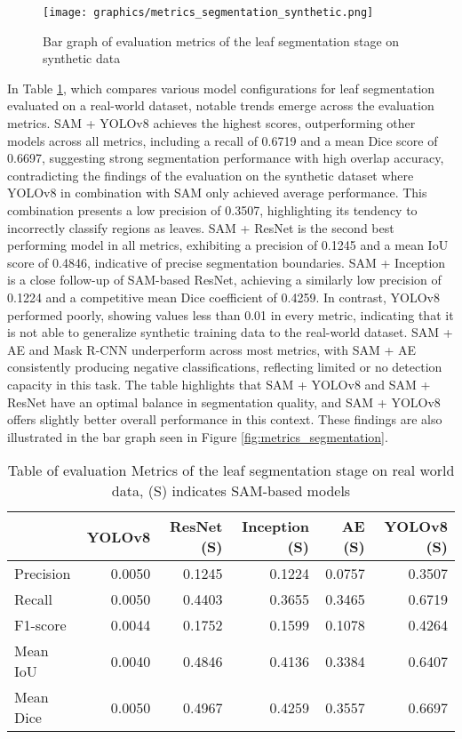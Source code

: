\documentclass[draft,final]{vutinfth} %
\begin{document}
\begin{figure}
    \centering
    \texttt{[image: graphics/metrics\_segmentation\_synthetic.png]}
    \caption{Bar graph of evaluation metrics of the leaf segmentation stage on synthetic data}
    \label{fig:metrics_segmentation_synthetic}
\end{figure}

In Table \ref{tab:metrics_segmentation}, which compares various model configurations for leaf segmentation evaluated on a real-world dataset, notable trends emerge across the evaluation metrics. SAM + YOLOv8 achieves the highest scores, outperforming other models across all metrics, including a recall of 0.6719 and a mean Dice score of 0.6697, suggesting strong segmentation performance with high overlap accuracy, contradicting the findings of the evaluation on the synthetic dataset where YOLOv8 in combination with SAM only achieved average performance. This combination presents a low precision of 0.3507, highlighting its tendency to incorrectly classify regions as leaves. SAM + ResNet is the second best performing model in all metrics, exhibiting a precision of 0.1245 and a mean IoU score of 0.4846, indicative of precise segmentation boundaries. SAM + Inception is a close follow-up of SAM-based ResNet, achieving a similarly low precision of 0.1224 and a competitive mean Dice coefficient of 0.4259. In contrast, YOLOv8 performed poorly, showing values less than 0.01 in every metric, indicating that it is not able to generalize synthetic training data to the real-world dataset. SAM + AE and Mask R-CNN underperform across most metrics, with SAM + AE consistently producing negative classifications, reflecting limited or no detection capacity in this task. The table highlights that SAM + YOLOv8 and SAM + ResNet have an optimal balance in segmentation quality, and SAM + YOLOv8 offers slightly better overall performance in this context. These findings are also illustrated in the bar graph seen in Figure \ref{fig:metrics_segmentation}.

\begin{table}[]
    \centering
    \begin{tabular}{lrrrrr}
    \toprule
     & YOLOv8 & ResNet (S) & Inception (S) & AE (S) & YOLOv8 (S) \\
    \midrule
    Precision & 0.0050 & 0.1245 & 0.1224 & 0.0757 & 0.3507 \\
    Recall & 0.0050 & 0.4403 & 0.3655 & 0.3465 & 0.6719 \\
    F1-score & 0.0044 & 0.1752 & 0.1599 & 0.1078 & 0.4264 \\
    Mean IoU & 0.0040 & 0.4846 & 0.4136 & 0.3384 & 0.6407 \\
    Mean Dice & 0.0050 & 0.4967 & 0.4259 & 0.3557 & 0.6697 \\
    \bottomrule
    \end{tabular}
    \caption{Table of evaluation Metrics of the leaf segmentation stage on real world data, (S) indicates SAM-based models}
    \label{tab:metrics_segmentation}
\end{table}
\end{document}
